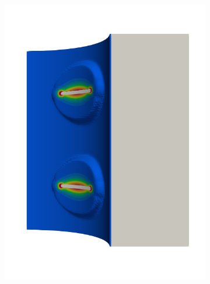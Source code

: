 \begin{frame}
\begin{columns}[T]
\begin{column}{0.6\textwidth}
\begin{figure}
{\begin{subfigure}{0.19\textwidth}
            \includegraphics[width=\textwidth]{Chapter345/figures/seed_ep_5}
          \end{subfigure}
        }
        

\end{figure}
\end{column}
\end{columns}
\end{frame}
